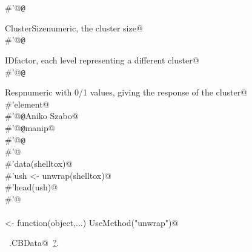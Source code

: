 \documentclass[reqno]{amsart}
\renewcommand{\NWlink}[2]{\hyperlink{#1}{#2}}
\begin{document}
\begin{flushleft}
\begin{list}{}{}
\mbox{}\verb@#'@{\tt @}\verb@return \item{ClusterSize}{numeric, the cluster size}@\\
\mbox{}\verb@#'@{\tt @}\verb@return \item{ID}{factor, each level representing a different cluster}@\\
\mbox{}\verb@#'@{\tt @}\verb@return \item{Resp}{numeric with 0/1 values, giving the response of the cluster@\\
\mbox{}\verb@#'element}@\\
\mbox{}\verb@#'@{\tt @}\verb@author Aniko Szabo@\\
\mbox{}\verb@#'@{\tt @}\verb@keywords manip@\\
\mbox{}\verb@#'@{\tt @}\verb@examples@\\
\mbox{}\verb@#'@\\
\mbox{}\verb@#'data(shelltox)@\\
\mbox{}\verb@#'ush <- unwrap(shelltox)@\\
\mbox{}\verb@#'head(ush)@\\
\mbox{}\verb@#'@\\
\mbox{}\verb@@\\
\mbox{}\verb@unwrap <- function(object,...) UseMethod("unwrap")@\\
\mbox{}\verb@@{\NWsep}
\end{list}
\vspace{-1.5ex}
\footnotesize
\begin{list}{}{\setlength{\itemsep}{-\parsep}\setlength{\itemindent}{-\leftmargin}}
\item \NWtxtIdentsUsed\nobreak\  \verb@unwrap.CBData@\nobreak\ \NWlink{nuweb?}{?}.
\item{}
\end{list}
\vspace{4ex}
\end{flushleft}
\end{document}
